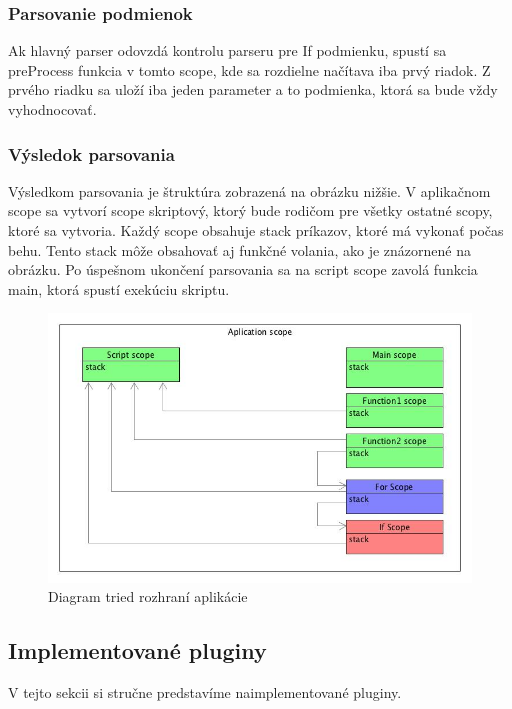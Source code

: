 \subsubsection{Parsovanie podmienok}
\indent Ak hlavný parser odovzdá kontrolu parseru pre If podmienku, spustí sa preProcess funkcia v tomto scope, kde sa rozdielne načítava iba prvý riadok.
Z prvého riadku sa uloží iba jeden parameter a to podmienka, ktorá sa bude vždy vyhodnocovať.
\subsubsection{Výsledok parsovania}
\indent Výsledkom parsovania je štruktúra zobrazená na obrázku nižšie. V aplikačnom scope sa vytvorí scope skriptový, ktorý bude rodičom pre všetky ostatné scopy, ktoré sa vytvoria. Každý scope obsahuje stack príkazov, ktoré má vykonať počas behu. Tento stack môže obsahovať aj funkčné volania, ako je znázornené na obrázku. Po úspešnom ukončení parsovania sa na script scope zavolá funkcia main, ktorá spustí exekúciu skriptu.
\begin{figure}[!htbp]
	\centering
	\includegraphics[width=\linewidth]{img/scopeStruct.jpg}
	\caption{Diagram tried rozhraní aplikácie}
	\label{fig:test}
\end{figure}
\subsection{Implementované pluginy}
\indent V tejto sekcii si stručne predstavíme naimplementované pluginy.
